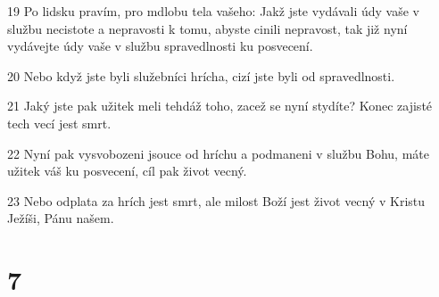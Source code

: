 \par 19 Po lidsku pravím, pro mdlobu tela vašeho: Jakž jste vydávali údy vaše v službu necistote a nepravosti k tomu, abyste cinili nepravost, tak již nyní vydávejte údy vaše v službu spravedlnosti ku posvecení.
\par 20 Nebo když jste byli služebníci hrícha, cizí jste byli od spravedlnosti.
\par 21 Jaký jste pak užitek meli tehdáž toho, zacež se nyní stydíte? Konec zajisté tech vecí jest smrt.
\par 22 Nyní pak vysvobozeni jsouce od hríchu a podmaneni v službu Bohu, máte užitek váš ku posvecení, cíl pak život vecný.
\par 23 Nebo odplata za hrích jest smrt, ale milost Boží jest život vecný v Kristu Ježíši, Pánu našem.

\chapter{7}

